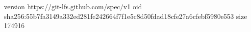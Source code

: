 version https://git-lfs.github.com/spec/v1
oid sha256:55b7fa3149a332ed281fe242664f7f1e5c8d50fdad18cfe27a6cfebf5980e553
size 174916
